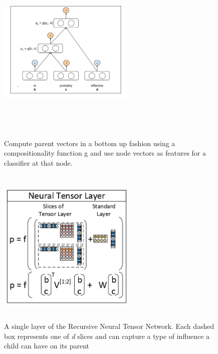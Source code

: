\documentclass{article}
\begin{document}
\begin{figure}
\centering
\begin{minipage}{.45\textwidth}
\centering
\includegraphics[width=6.5cm,height=8.2cm,keepaspectratio]{rntn1.png}
\caption{Compute parent vectors in a bottom up fashion using a compositionality function g and use node vectors as features for a classifier at that node.\autocite{Socher2013}}
\label{fig:RNTNexpl}
\end{minipage}
\begin{minipage}{.1\textwidth}
\end{minipage}
\begin{minipage}{.45\textwidth}
\centering
\includegraphics[width=6.6cm,height=7.6cm,keepaspectratio]{neural_tensor_network.PNG}
\caption{A single layer of the Recursive Neural Tensor Network. Each dashed box represents one of {\it d} slices and can capture a type of influence a child can have on its parent \autocite{Socher2013}}
\label{fig:RNTN}
\end{minipage}
\end{figure}
\end{document}
